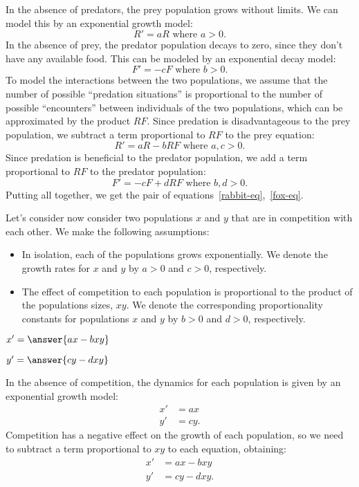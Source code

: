 \documentclass{ximera}
\begin{document}
In the absence of predators, the prey population grows without limits. We can model this by an exponential growth model:
\[
R'=aR\text{ where $a>0$}.
\]
In the absence of prey, the predator population decays to zero, since they don't have any available food. This can be modeled by an exponential decay model:
\[
F'=-cF\text{ where $b>0$.}
\]
To model the interactions between the two populations, we assume that the number of possible ``predation situations'' is proportional to the number of possible ``encounters'' between individuals of the two populations, which can be approximated by the product $RF$.
Since predation is disadvantageous to the prey population, we subtract a term proportional to $RF$ to the prey equation:
\[
R'=aR-bRF\text{ where $a,c>0$}.
\]
Since predation is beneficial to the predator population, we add a term proportional to $RF$ to the predator population:
\[
F'=-cF+dRF\text{ where $b,d>0$.}
\]
Putting all together, we get the pair of equations~\ref{rabbit-eq},~\ref{fox-eq}.

\begin{problem}

Let's consider now consider two populations $x$ and $y$ that are in competition with each other. We make the following assumptions:
\begin{itemize}
\item In isolation, each of the populations grows exponentially. We denote the growth rates for $x$ and $y$ by $a>0$ and $c>0$, respectively. 
\item The effect of competition to each population is proportional to the product of the populations sizes, $xy$. We denote the corresponding proportionality constants for populations $x$ and $y$ by $b>0$ and $d>0$, respectively.
\end{itemize}

\begin{question}
$x'= \answer{ax-bxy}$
\end{question}
\begin{question}
$y'= \answer{cy-dxy}$
\end{question}
\end{problem}

\begin{explanation} 
In the absence of competition, the dynamics for each population is given by an exponential growth model:
\begin{align*}
x'&=ax\\
y'&=cy.
\end{align*}
Competition has a negative effect on the growth of each population, so we need to subtract a term proportional to $xy$ to each equation, obtaining:
\begin{align*}
x'&=ax-bxy\\
y'&=cy-dxy.
\end{align*}
\end{explanation}
\end{document}
